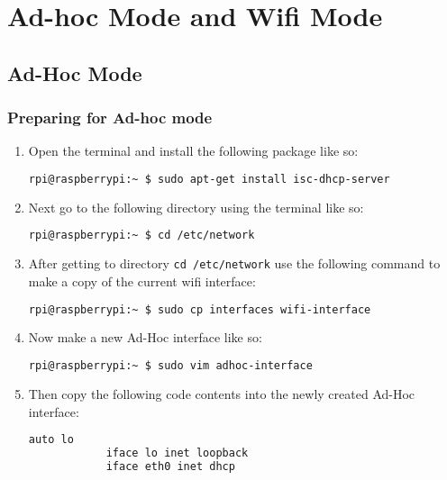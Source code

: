 \documentclass{article}
\begin{document}
    \section{Ad-hoc Mode and Wifi Mode}
    \subsection{Ad-Hoc Mode}
    \subsubsection{Preparing for Ad-hoc mode}
    \begin{enumerate}
        \item Open the terminal and install the following package like so: 
        \begin{lstlisting}[language=bash]
            rpi@raspberrypi:~ $ sudo apt-get install isc-dhcp-server 
        \end{lstlisting}
        \item Next go to the following directory using the terminal like so: 
        \begin{lstlisting}[language=bash]
            rpi@raspberrypi:~ $ cd /etc/network 
        \end{lstlisting}
        \item After getting to  directory \verb|cd /etc/network| use the following command to make a copy of the current wifi interface: 
        \begin{lstlisting}[language=bash]
            rpi@raspberrypi:~ $ sudo cp interfaces wifi-interface 
        \end{lstlisting}
        \item Now make a new Ad-Hoc interface like so: 
        \begin{lstlisting}[language=bash]
            rpi@raspberrypi:~ $ sudo vim adhoc-interface 
        \end{lstlisting}
        \item Then copy the following code contents into the newly created Ad-Hoc interface: 
        \begin{lstlisting}[language=bash]
            auto lo
            iface lo inet loopback
            iface eth0 inet dhcp
          

\end{lstlisting}
\end{enumerate}
\end{document}
